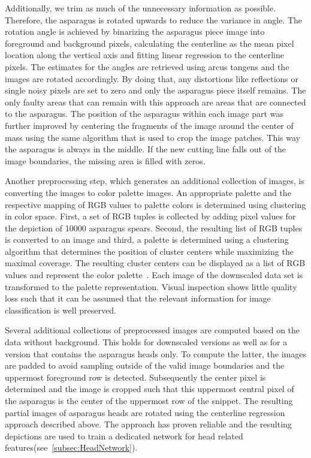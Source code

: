Additionally, we trim as much of the unnecessary information as possible. Therefore, the asparagus is rotated upwards to reduce the variance in angle. The rotation angle is achieved by binarizing the asparagus piece image into foreground and background pixels, calculating the centerline as the mean pixel location along the vertical axis and fitting linear regression to the centerline pixels. The estimates for the angles are retrieved using arcus tangens and the images are rotated accordingly. By doing that, any distortions like reflections or single noisy pixels are set to zero and only the asparagus piece itself remains. The only faulty areas that can remain with this approach are areas that are connected to the asparagus. The position of the asparagus within each image part was further improved by centering the fragments of the image around the center of mass using the same algorithm that is used to crop the image patches. This way the asparagus is always in the middle. If the new cutting line falls out of the image boundaries, the missing area is filled with zeros. 

Another preprocessing step, which generates an additional collection of images, is converting the images to color palette images. An appropriate palette and the respective mapping of RGB values to palette colors is determined using clustering in color space. First, a set of RGB tuples is collected by adding pixel values for the depiction of 10000 asparagus spears. Second, the resulting list of RGB tuples is converted to an image and third, a palette is determined using a clustering algorithm that determines the position of cluster centers while maximizing the  maximal coverage. The resulting cluster centers can be displayed as a list of RGB values and represent the color palette~\citep{pil_quantization,zarandi2011large}. Each image of the downscaled data set is transformed to the palette representation. Visual inspection shows little quality loss such that it can be assumed that the relevant information for image classification is well preserved.

Several additional collections of preprocessed images are computed based on the data without background. This holds for downscaled versions as well as for a version that contains the asparagus heads only. To compute the latter, the images are padded to avoid sampling outside of the valid image boundaries and the uppermost foreground row is detected. Subsequently the center pixel is determined and the image is cropped such that this uppermost central pixel of the asparagus is the center of the uppermost row of the snippet. The resulting partial images of asparagus heads are rotated using the centerline regression approach described above. The approach has proven reliable and the resulting depictions are used to train a dedicated network for head related features(see~\autoref{subsec:HeadNetwork}).


